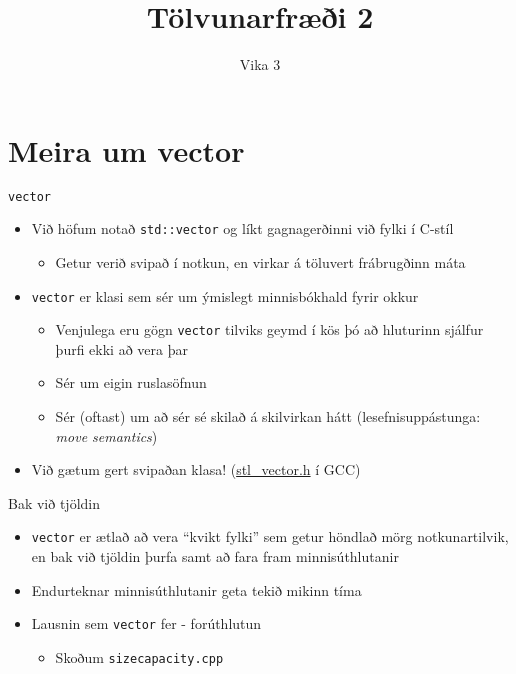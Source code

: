 \documentclass[handout]{beamer}
\title{Tölvunarfræði 2}
\subtitle{Vika 3}
\begin{document}
\begin{frame}
\titlepage
\end{frame}

\section{Meira um vector}

\begin{frame}{\texttt{vector}}
\begin{itemize}
 \item Við höfum notað \texttt{std::vector} og líkt gagnagerðinni við fylki í C-stíl
 \begin{itemize}
  \item Getur verið svipað í notkun, en virkar á töluvert frábrugðinn máta
 \end{itemize}
 \item \texttt{vector} er klasi sem sér um ýmislegt minnisbókhald fyrir okkur
 \begin{itemize}
  \item Venjulega eru gögn \texttt{vector} tilviks geymd í kös þó að hluturinn sjálfur þurfi ekki að vera þar
  \item Sér um eigin ruslasöfnun
  \item Sér (oftast) um að sér sé skilað á skilvirkan hátt (lesefnisuppástunga: \emph{move semantics})
 \end{itemize}
 \item Við gætum gert svipaðan klasa! (\href{https://gcc.gnu.org/onlinedocs/libstdc++/latest-doxygen/a01523_source.html}{stl\_vector.h} í GCC)
\end{itemize}
\end{frame}

\begin{frame}{Bak við tjöldin}
\begin{itemize}
 \item \texttt{vector} er ætlað að vera ``kvikt fylki'' sem getur höndlað mörg notkunartilvik, en bak við tjöldin þurfa samt að fara fram minnisúthlutanir
 \item Endurteknar minnisúthlutanir geta tekið mikinn tíma 
 \item Lausnin sem \texttt{vector} fer - forúthlutun
 \begin{itemize}
  \item Skoðum \texttt{sizecapacity.cpp}
 \end{itemize}
\end{itemize}
\end{frame}
\end{document}
